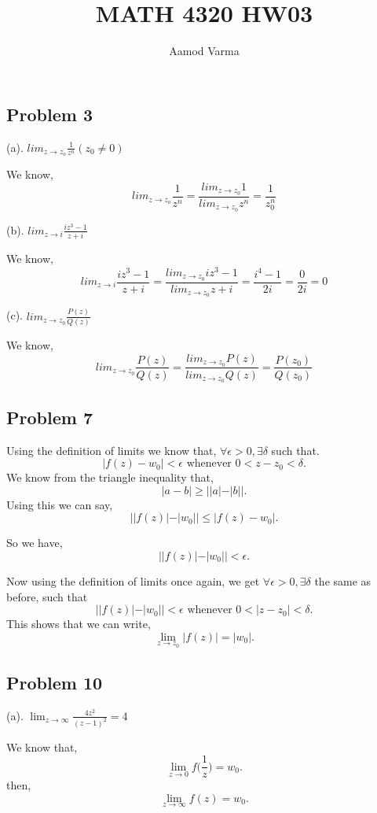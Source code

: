 \documentclass[a4paper]{report}
\title{MATH 4320 HW03}
\author{Aamod Varma}
\begin{document}
\maketitle


\subsection*{Problem 3}
(a). $lim_{z \rightarrow z_o} \frac{1}{z^n}(z_0 \neq 0)$

We know, $$lim_{z \rightarrow z_o} \frac{1}{z^n} = \frac{lim_{z \rightarrow z_0}1} {lim_{z \rightarrow z_0}{z^n}} = \frac{1}{z_0^n}$$

(b). $lim_{z \rightarrow i} \frac{iz^3 - 1}{z + i}$


We know, $$lim_{z \rightarrow i} \frac{iz^3 - 1}{z + i} = \frac{lim_{z \rightarrow z_0}iz^3 - 1} {lim_{z \rightarrow z_0}{z + i}} = \frac{i^4 - 1}{2i} = \frac{0}{2i} = 0$$


(c). $lim_{z \rightarrow z_0} \frac{P(z)}{Q(z)}$

We know, $$lim_{z \rightarrow z_0} \frac{P(z)}{Q(z)} = \frac{lim_{z \rightarrow z_0}P(z)} {lim_{z \rightarrow z_0}{Q(z)}} = \frac{P(z_0)}{Q(z_0)}$$




\subsection*{Problem 7}
Using the definition of limits we know that, $\forall \epsilon > 0, \exists \delta$ such that. \[
    |f(z) - w_0| < \epsilon \text{ whenever } 0 < z - z_0 < \delta
.\] 
We know from the triangle inequality that, \[
|a - b| \ge ||a| - |b||
.\] 
Using this we can say, \[
||f(z)| - |w_0|| \le |f(z) - w_0|
.\] 

So we have, \[
||f(z)| - |w_0|| < \epsilon
.\] 

Now using the definition of limits once again, we get $\forall \epsilon > 0, \exists \delta$ the same as before, such that  \[
    ||f(z)| - |w_0|| < \epsilon \text{ whenever } 0 < |z - z_0| < \delta
.\] 
This shows that we can write, \[
\lim_{z \to z_0} |f(z)| = |w_0|
.\] 

\subsection*{Problem 10}
(a). $\lim_{z \to \infty} \frac{4z^2}{(z-1)^2} = 4$ 

We know that, \[
\lim_{z \to 0} f\bigg (\frac{1}{z}\bigg ) = w_0
.\] 
then, \[
\lim_{z \to \infty} f(z) = w_0
.\] 
\end{document}
